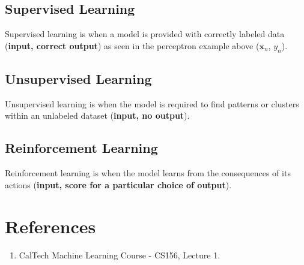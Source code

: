 \documentclass[12pt, letterpaper]{article}
\begin{document}
\subsection{Supervised Learning}
Supervised learning is when a model is provided with correctly labeled data (\textbf{input, correct output}) as seen in the perceptron example above ($\mathbf{x}_n$, $y_n$).

\subsection{Unsupervised Learning}
Unsupervised learning is when the model is required to find patterns or clusters within an unlabeled dataset (\textbf{input, no output}).

\subsection{Reinforcement Learning}
Reinforcement learning is when the model learns from the consequences of its actions (\textbf{input, score for a particular choice of output}).


\section{References}
\begin{enumerate}
    \item CalTech Machine Learning Course - CS156, Lecture 1.
\end{enumerate}
\end{document}
